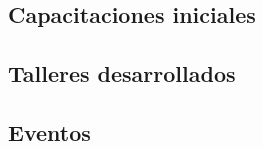 \subsection{Capacitaciones iniciales}
\subsection{Talleres desarrollados}
\subsection{Eventos}
\subsection{}
\subsection{}




